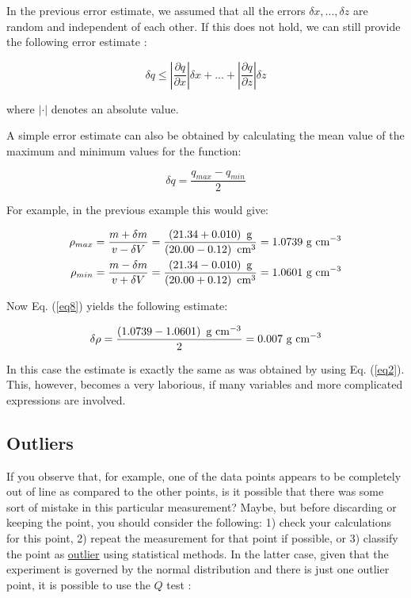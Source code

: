 \documentclass[byrevtex,amssymb,aps,pra,floatfix,letterpaper]{revtex4}
\begin{document}
In the previous error estimate, we assumed that all the errors $\delta x, ..., \delta z$ are random and
independent of each other. If this does not hold, we can still provide the following error estimate \cite{TAYLOR}:

\begin{equation}
\label{eq7}
\delta q \le \left|\frac{\partial q}{\partial x}\right|\delta x + ... + \left|\frac{\partial q}{\partial z}\right|\delta z
\end{equation}

\noindent
where $\left| \cdot \right|$ denotes an absolute value.

A simple error estimate can also be obtained by calculating the mean value of the maximum and minimum values for the function:

\begin{equation}
\label{eq8}
\delta q = \frac{q_{max} - q_{min}}{2}
\end{equation}

\noindent
For example, in the previous example this would give:

\begin{eqnarray}
\label{eq9}
\rho_{max} = \frac{m + \delta m}{v - \delta V} = \frac{\left(21.34 + 0.010\right)\textnormal{ g}}{\left(20.00 - 0.12\right)\textnormal{ cm}^3} = 1.0739\textnormal{ g cm}^{-3}\\
\nonumber
\rho_{min} = \frac{m - \delta m}{v + \delta V} = \frac{\left(21.34 - 0.010\right)\textnormal{ g}}{\left(20.00 + 0.12\right)\textnormal{ cm}^3} = 1.0601\textnormal{ g cm}^{-3}
\end{eqnarray}

\noindent
Now Eq. (\ref{eq8}) yields the following estimate:

\begin{equation}
\label{eq10}
\delta\rho = \frac{\left(1.0739 - 1.0601\right)\textnormal{ g cm}^{-3}}{2} = 0.007\textnormal{ g cm}^{-3}
\end{equation}

\noindent
In this case the estimate is exactly the same as was obtained by using Eq. (\ref{eq2}). This, however,
becomes a very laborious, if many variables and more complicated expressions are involved.

\subsection{Outliers}

If you observe that, for example, one of the data points appears to be completely out of line as compared to the other points, is it possible that there was some sort of mistake in this particular measurement? Maybe, but before discarding or keeping the point, you should consider the following: 1) check your calculations for this point, 2) repeat the measurement for that point if possible, or 3) classify the point as \href{http://en.wikipedia.org/wiki/Outlier}{\underline{outlier}} using statistical methods. In the latter case, given that the experiment is governed by the normal distribution and there is just one outlier point, it is possible to use the $Q$ test \cite{MCBANE}:
\end{document}
